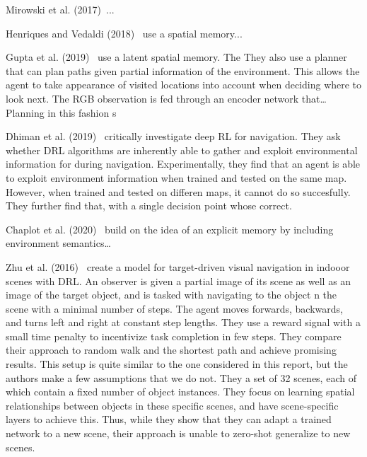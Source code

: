

Mirowski et al. (2017)~\cite{mirowski_navigate_2017}...

Henriques and Vedaldi (2018)~\cite{henriques_vedaldi_2018} use a spatial memory...

Gupta et al. (2019)~\cite{gupta_cognitive_2019} use a latent spatial memory.
The 
They also use a planner that can plan paths given partial information of the environment.
This allows the agent to take appearance of visited locations into account when deciding where to look next.
The RGB observation is fed through an encoder network that\dots
Planning in this fashion s

Dhiman et al. (2019)~\cite{dhiman_critical_2019} critically investigate deep RL for navigation.
They ask whether DRL algorithms are inherently able to gather and exploit environmental information for during navigation.
Experimentally, they find that an agent is able to exploit environment information when trained and tested on the same map.
However, when trained and tested on differen maps, it cannot do so succesfully.
They further find that, with a single decision point whose correct.

Chaplot et al. (2020)~\cite{chaplot_semantic_2020} build on the idea of an explicit memory by including environment semantics\dots

Zhu et al. (2016)~\cite{zhu_target_driven_2016} create a model for target-driven visual navigation in indooor scenes with DRL.
An observer is given a partial image of its scene as well as an image of the target object, and is tasked with navigating to the object n the scene with a minimal number of steps.
The agent moves forwards, backwards, and turns left and right at constant step lengths.
They use a reward signal with a small time penalty to incentivize task completion in few steps.
They compare their approach to random walk and the shortest path and achieve promising results.
This setup is quite similar to the one considered in this report, but the authors make a few assumptions that we do not.
They a set of 32 scenes, each of which contain a fixed number of object instances.
They focus on learning spatial relationships between objects in these specific scenes, and have scene-specific layers to achieve this.
Thus, while they show that they can adapt a trained network to a new scene, their approach is unable to zero-shot generalize to new scenes.

